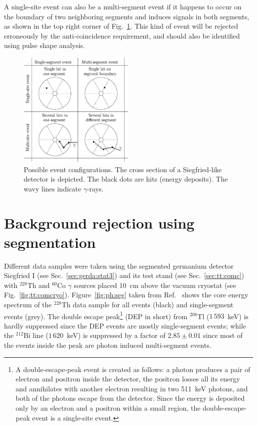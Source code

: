 A single-site event can also be a multi-segment event if it happens to
occur on the boundary of two neighboring segments and induces signals
in both segments, as shown in the top right corner of
Fig.~\ref{fig:ph:eve}. This kind of event will be rejected erroneously
by the anti-coincidence requirement, and should also be identified
using pulse shape analysis.

\begin{figure}[htbp]
\centering
\includegraphics[width=0.5\textwidth]{events}
\caption{Possible event configurations. The cross section of a
Siegfried-like detector is depicted. The black dots are hits (energy
deposits). The wavy lines indicate $\gamma$-rays.}
\label{fig:ph:eve}
\end{figure}

\section{Background rejection using segmentation}
\label{sec:ph:seg}
Different data samples were taken using the segmented germanium
detector Siegfried I (see Sec.~\ref{sec:gerda:stat3}) and its test
stand (see Sec.~\ref{sec:tt:comc}) with $^{228}$Th and $^{60}$Co
$\gamma$ sources placed 10~cm above the vacuum cryostat (see
Fig.~\ref{fig:tt:comcryo}). Figure~\ref{fig:ph:seg} taken from
Ref.~\cite{Pid07} shows the core energy spectrum of the $^{228}$Th
data sample for all events (black) and single-segment events
(grey). The double escape peak\footnote{A double-escape-peak event is
created as follows: a photon produces a pair of electron and positron
inside the detector, the positron losses all its energy and
annihilates with another electron resulting in two 511~keV photons,
and both of the photons escape from the detector. Since the energy is
deposited only by an electron and a positron within a small region,
the double-escape-peak event is a single-site event.} (DEP in short)
from $^{208}$Tl ($1\,593$~keV) is hardly suppressed since the DEP
events are mostly single-segment events; while the $^{212}$Bi line
($1\,620$~keV) is suppressed by a factor of $2.85 \pm 0.01$ since most
of the events inside the peak are photon induced multi-segment events.

